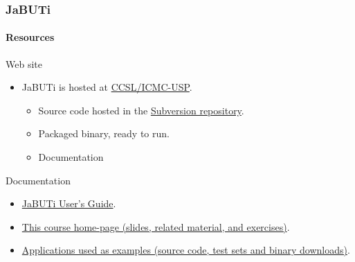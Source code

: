 \begin{frame}[parent={cmap:jabuti},hasnext=true,hasprev=true]
\frametitle{JaBUTi}
\framesubtitle{Resources}
\label{concept:site}
\label{concept:binary-package-download}
\label{concept:subversion-repository}
\label{concept:documentation}
\label{concept:free-courses}
\label{concept:users-guide}
\label{concept:running-examples}

\begin{block:fact}{Web site}
\begin{itemize}
	\item JaBUTi is hosted at \href{http://ccsl.icmc.usp.br/drupal5/en/content/jabuti}{CCSL/ICMC-USP}.
	\begin{itemize}
		\item Source code hosted in the \href{svn://ccsl.ime.usp.br/jabuti/}{Subversion repository}.
		\item Packaged binary, ready to run.
		\item Documentation
	\end{itemize}
\end{itemize}
\end{block:fact}

\begin{block:fact}{Documentation}
\begin{itemize}
	\item \href{http://143.107.183.152/Projects/Testing/images/JaBUTi_manual.pdf}{JaBUTi User's Guide}.

	\item \href{http://143.107.183.152/Projects/Testing/JaBUTi_course}{This
	course home-page (slides, related material, and exercises)}.

	\item \href{http://143.107.183.152/Projects/Testing/JaBUTi_Examples/}{Applications
	used as examples (source code, test sets and binary downloads)}.
\end{itemize}
\end{block:fact}
\end{frame}
